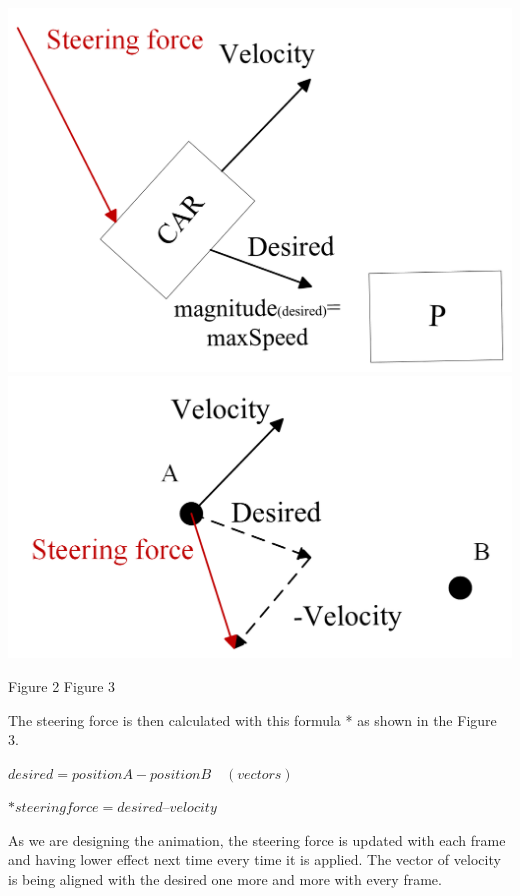 \documentclass[10pt,twoside,english,a4paper]{article}
\begin{document}
\includegraphics[scale=0.25]{diagram_car.png} 	
\includegraphics[scale=0.25]{diagram_steeringForce.png}\par
\quad Figure 2 
\hspace*{\fill} Figure 3
\bigbreak

The steering force is then calculated with this formula * as shown 
in the Figure 3.

\begin{center}
$desired =position A - position B \quad (vectors)$ \par
$ *steering force= desired – velocity$

\end{center}

As we are designing the animation, the steering force is updated with 
each frame and having lower effect next time every time it is applied. 
The vector of velocity is being aligned with the desired one
more and more with every frame.
\end{document}
